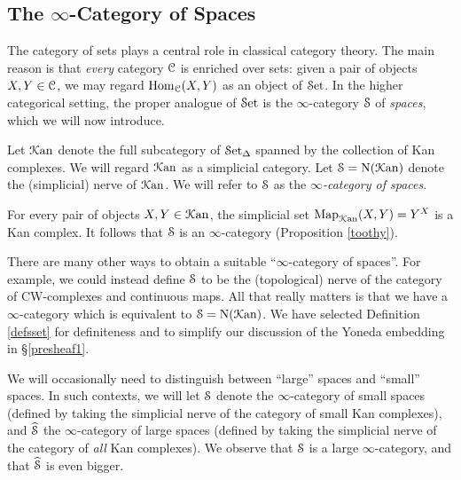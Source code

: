 \subsection{The $\infty$-Category of Spaces}\label{introducingspaces}
\begin{1.2.16 The inf-cat of spaces}
The category of sets plays a central role in classical category theory. The main reason
is that {\em every} category $\operatorname{\mathcal{C}}$ is enriched over sets: given a pair of objects
$X,Y \in \operatorname{\mathcal{C}}$, we may regard $\operatorname{Hom}_{\operatorname{\mathcal{C}}}(X,Y)$ as an object of $\operatorname{\mathcal{S}et}$.
In the higher categorical setting, the proper analogue of $\operatorname{\mathcal{S}et}$ is the
$\infty$-category $\operatorname{\mathcal{S}}$ of {\it spaces}, which we will now
introduce.

\begin{definition}\label{defsset}
Let $\operatorname{\mathcal{K}an}$ denote the full subcategory of $\operatorname{\mathcal{S}et_{\Delta}}$ spanned by the collection of Kan complexes. 
We will regard $\operatorname{\mathcal{K}an}$ as a simplicial category. Let $\operatorname{\mathcal{S}} = \operatorname{N}(\operatorname{\mathcal{K}an})$ denote the (simplicial) nerve of $\operatorname{\mathcal{K}an}$. We will refer to $\operatorname{\mathcal{S}}$ as the {\it $\infty$-category of spaces}.
\end{definition}

\begin{remark}
For every pair of objects $X,Y \in \operatorname{\mathcal{K}an}$, the simplicial set
$\operatorname{{Map}}_{\operatorname{\mathcal{K}an}}(X,Y) = Y^X$ is a Kan complex. It follows that
$\operatorname{\mathcal{S}}$ is an $\infty$-category (Proposition \ref{toothy}).
\end{remark}

\begin{remark}
There are many other ways to obtain a suitable ``$\infty$-category of
spaces''. For example, we could instead define $\operatorname{\mathcal{S}}$ to be the (topological) nerve
of the category of CW-complexes and continuous maps.
All that really matters is that we have a $\infty$-category which is equivalent to $\operatorname{\mathcal{S}} = \operatorname{N}(\operatorname{\mathcal{K}an})$. 
We have selected Definition \ref{defsset} for definiteness and to simplify our discussion of the
Yoneda embedding in \S \ref{presheaf1}.
\end{remark}

\begin{remark}
We will occasionally need to distinguish between ``large'' spaces and ``small'' spaces.
In such contexts, we will let $\operatorname{\mathcal{S}}$ denote the $\infty$-category of small spaces (defined
by taking the simplicial nerve of the category of small Kan complexes), and $\widehat{\operatorname{\mathcal{S}}}$ the $\infty$-category of large spaces (defined by taking the simplicial nerve of the
category of {\em all} Kan complexes). We observe that $\operatorname{\mathcal{S}}$ is a large $\infty$-category, and that
$\widehat{\operatorname{\mathcal{S}}}$ is even bigger.
\end{remark}
\end{1.2.16 The inf-cat of spaces}
